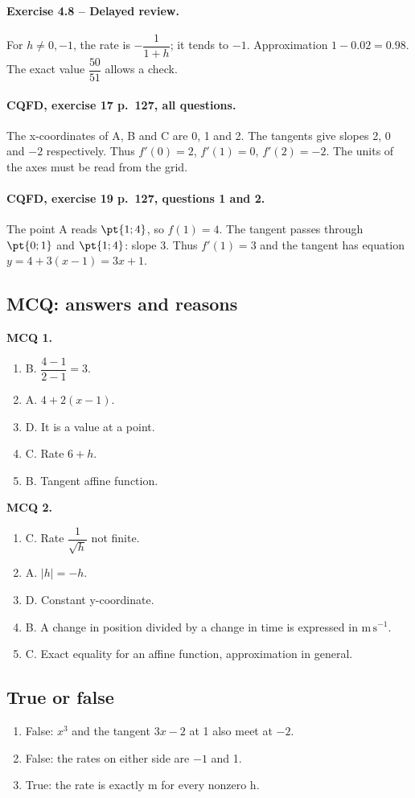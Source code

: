 \paragraph{Exercise 4.8 -- Delayed review.} For $h\ne0,-1$, the rate is $-\dfrac{1}{1+h}$; it tends to $-1$. Approximation $1-\num{0,02}=\num{0,98}$. The exact value $\dfrac{50}{51}$ allows a check.
\paragraph{CQFD, exercise 17 p.~127, all questions.} The x-coordinates of A, B and C are 0, 1 and 2. The tangents give slopes 2, 0 and $-2$ respectively. Thus $f\prime(0)=2$, $f\prime(1)=0$, $f\prime(2)=-2$. The units of the axes must be read from the grid.
\paragraph{CQFD, exercise 19 p.~127, questions 1 and 2.} The point A reads $\pt{1;4}$, so $f(1)=4$. The tangent passes through $\pt{0;1}$ and $\pt{1;4}$: slope 3. Thus $f\prime(1)=3$ and the tangent has equation $y=4+3(x-1)=3x+1$.
\subsection*{MCQ: answers and reasons}
\textbf{MCQ 1.}
\begin{enumerate}
\item B. $\dfrac{4-1}{2-1}=3$.
\item A. $4+2(x-1)$.
\item D. It is a value at a point.
\item C. Rate $6+h$.
\item B. Tangent affine function.
\end{enumerate}
\textbf{MCQ 2.}
\begin{enumerate}
\item C. Rate $\dfrac{1}{\sqrt h}$ not finite.
\item A. $|h|=-h$.
\item D. Constant y-coordinate.
\item B. A change in position divided by a change in time is expressed in $\mathrm{m\,s^{-1}}$.
\item C. Exact equality for an affine function, approximation in general.
\end{enumerate}
\subsection*{True or false}
\begin{enumerate}
\item False: $x^3$ and the tangent $3x-2$ at 1 also meet at $-2$.
\item False: the rates on either side are $-1$ and 1.
\item True: the rate is exactly m for every nonzero h.
\end{enumerate}
